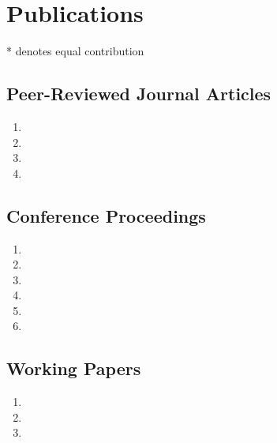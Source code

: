 \documentclass[10pt,letterpaper]{article}
\begin{document}
\vspace{-0.1in}

\section*{Publications}

* denotes equal contribution

\vspace{-0.05in}


\subsection*{Peer-Reviewed Journal Articles}

\begin{enumerate}
\item {}
\item {}
\item {}
\item {}
\end{enumerate}

\subsection*{Conference Proceedings}

\begin{enumerate}[resume]
\item {}
\item {}
\item {}
\item {}
\item {}
\item {}
\end{enumerate}

\subsection*{Working Papers}
\begin{enumerate}[resume]
\item {}
\item {}
\item {}
\end{enumerate}
\end{document}
